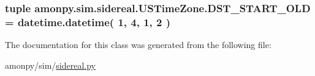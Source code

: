 \hypertarget{classamonpy_1_1sim_1_1sidereal_1_1_u_s_time_zone_afea8d961d34e0b6a75bdad0f9ac41b34}{
\subsubsection[{D\-S\-T\-\_\-\-S\-T\-A\-R\-T\-\_\-\-O\-L\-D}]{\setlength{\rightskip}{0pt plus 5cm}tuple amonpy.\-sim.\-sidereal.\-U\-S\-Time\-Zone.\-D\-S\-T\-\_\-\-S\-T\-A\-R\-T\-\_\-\-O\-L\-D = datetime.\-datetime( 1, 4, 1, 2 )\hspace{0.3cm}{\ttfamily [static]}}}\label{classamonpy_1_1sim_1_1sidereal_1_1_u_s_time_zone_afea8d961d34e0b6a75bdad0f9ac41b34}


The documentation for this class was generated from the following file\-:\begin{DoxyCompactItemize}
\item 
amonpy/sim/\hyperlink{sidereal_8py}{sidereal.\-py}\end{DoxyCompactItemize}
